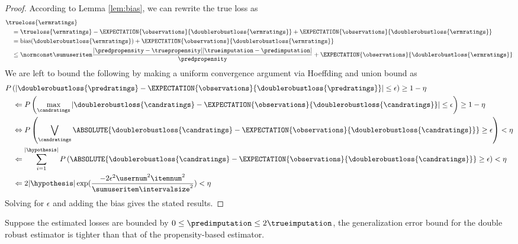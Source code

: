 \begin{proof}
According to Lemma \ref{lem:bias}, we can rewrite the true loss as
\begin{equation*}
\begin{aligned}
&
\trueloss{\ermratings}
\\&\quad
=
\trueloss{\ermratings}
-
\EXPECTATION{\observations}{\doublerobustloss{\ermratings}}
+
\EXPECTATION{\observations}{\doublerobustloss{\ermratings}}
\\&\quad
=
\text{bias}(\doublerobustloss{\ermratings})
+
\EXPECTATION{\observations}{\doublerobustloss{\ermratings}}
\\&\quad
\leq
\normconst\sumuseritem
\frac{|\predpropensity-\truepropensity||\trueimputation-\predimputation|}{\predpropensity}
+
\EXPECTATION{\observations}{\doublerobustloss{\ermratings}}
\end{aligned}
\end{equation*}%
We are left to bound the following by making a uniform convergence argument via Hoeffding and union bound as
\begin{equation*}
\begin{aligned}
&
P
\left(
\left|
\doublerobustloss{\predratings}-\EXPECTATION{\observations}{\doublerobustloss{\predratings}}
\right|
\leq\epsilon
\right)
\geq1-\eta
\\&\quad\Leftarrow
P
\left(
\max_{\candratings}
\left|
\doublerobustloss{\candratings}-\EXPECTATION{\observations}{\doublerobustloss{\candratings}}
\right|
\leq\epsilon
\right)
\geq1-\eta
\\&\quad\Leftrightarrow
P
\left(
\bigvee_{\candratings}
\ABSOLUTE{
\doublerobustloss{\candratings}-\EXPECTATION{\observations}{\doublerobustloss{\candratings}}
}
\geq\epsilon
\right)
<\eta
\\&\quad\Leftarrow
\sum_{i=1}^{|\hypothesis|}
P
\left(
\ABSOLUTE{
\doublerobustloss{\candratings}-\EXPECTATION{\observations}{\doublerobustloss{\candratings}}
}
\geq\epsilon
\right)
<\eta
\\&\quad\Leftarrow
2|\hypothesis|
\exp(
\frac{-2\epsilon^{2}\usernum^{2}\itemnum^{2}}
{\sumuseritem\intervalsize^{2}}
)
<\eta
\end{aligned}
\end{equation*}%
Solving for $\epsilon$ and adding the bias gives the stated results.
\end{proof}
\begin{theorem}
Suppose the estimated losses are bounded by $0\leq\predimputation\leq 2\trueimputation$, the generalization error bound for the double robust estimator is tighter than that of the propensity-based estimator.
\end{theorem}
